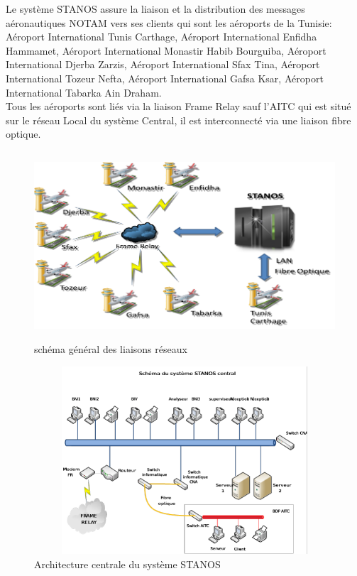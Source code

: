 Le système STANOS assure la liaison et la distribution des messages aéronautiques NOTAM vers ses clients qui sont les aéroports de la Tunisie: Aéroport International Tunis Carthage, Aéroport International Enfidha Hammamet, Aéroport International Monastir Habib Bourguiba, Aéroport International Djerba Zarzis, Aéroport International Sfax Tina, Aéroport International Tozeur Nefta, Aéroport International Gafsa Ksar, Aéroport International Tabarka Ain Draham.\\

Tous les aéroports sont liés via la liaison Frame Relay sauf l’AITC qui est situé sur le réseau Local du système Central, il est interconnecté via  une liaison fibre optique.   

\begin{figure}[!h]
\begin{center}
\includegraphics[width=13cm,height=7cm]{existant/stanos.png}
\end{center}
\caption{schéma général des liaisons réseaux}
\end{figure}

\begin{figure}[!h]
\begin{center}
\includegraphics[width=13cm,height=7cm]{existant/Untitled.png}
\end{center}
\caption{Architecture centrale du système STANOS}
\end{figure}
\newpage
